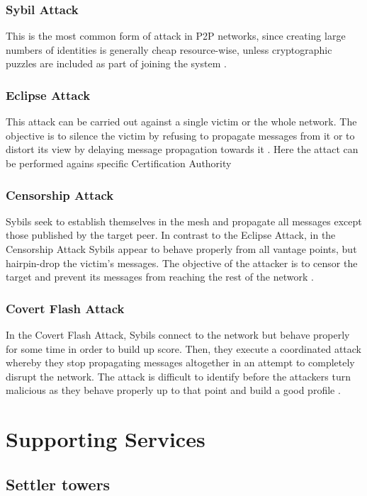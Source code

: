 \documentclass{article}
\begin{document}
\subsubsection{Sybil Attack}
This is the most common form of attack in P2P networks, since creating large numbers of identities is
generally cheap resource-wise, unless cryptographic puzzles are included as part of joining the system \cite{GossipSub}.

\subsubsection{Eclipse Attack}
This attack can be carried out against a single victim or the whole network. The objective is to
silence the victim by refusing to propagate messages from it or to distort its view by delaying message propagation towards it \cite{GossipSub}.
Here the attact can be performed agains specific Certification Authority

\subsubsection{Censorship Attack}
Sybils seek to establish themselves in the mesh and propagate all messages except those published by the target peer. In contrast to the Eclipse Attack, in the Censorship Attack Sybils appear to behave properly
from all vantage points, but hairpin-drop the victim's messages. The objective of the attacker is to censor the target and prevent its messages from reaching the rest of the network \cite{GossipSub}.

\subsubsection{Covert Flash Attack}
In the Covert Flash Attack, Sybils connect to the network but behave properly for some time in order to build up score. Then, they execute a coordinated attack whereby they stop propagating messages altogether in an attempt to completely disrupt the network. The attack is difficult to identify before the attackers turn malicious as they behave properly up to that point and build a good profile \cite{GossipSub}.

\section{Supporting Services}

\subsection{Settler towers}
\end{document}
